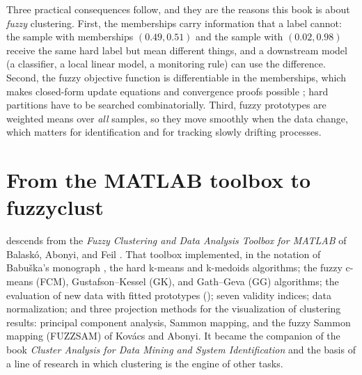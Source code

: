 Three practical consequences follow, and they are the reasons this book is about \emph{fuzzy} clustering. First, the memberships carry information that a label cannot: the sample with memberships $(0.49, 0.51)$ and the sample with $(0.02, 0.98)$ receive the same hard label but mean different things, and a downstream model (a classifier, a local linear model, a monitoring rule) can use the difference. Second, the fuzzy objective function is differentiable in the memberships, which makes closed-form update equations and convergence proofs possible \cite{bezdek:1980:convergence,bezdek:1987:convergence}; hard partitions have to be searched combinatorially. Third, fuzzy prototypes are weighted means over \emph{all} samples, so they move smoothly when the data change, which matters for identification and for tracking slowly drifting processes.

\section{From the MATLAB toolbox to fuzzyclust}\label{sec:intro:lineage}

 descends from the \emph{Fuzzy Clustering and Data Analysis Toolbox for MATLAB} of Balaskó, Abonyi, and Feil \cite{balasko:2005:toolbox}. That toolbox implemented, in the notation of Babu\v{s}ka's monograph \cite{babuska:1998:book}, the hard k-means and k-medoids algorithms; the fuzzy c-means (FCM), Gustafson--Kessel (GK), and Gath--Geva (GG) algorithms; the evaluation of new data with fitted prototypes (); seven validity indices; data normalization; and three projection methods for the visualization of clustering results: principal component analysis, Sammon mapping, and the fuzzy Sammon mapping (FUZZSAM) of Kov\'acs and Abonyi. It became the companion of the book \emph{Cluster Analysis for Data Mining and System Identification} \cite{abonyi:2007:book} and the basis of a line of research in which clustering is the engine of other tasks.

